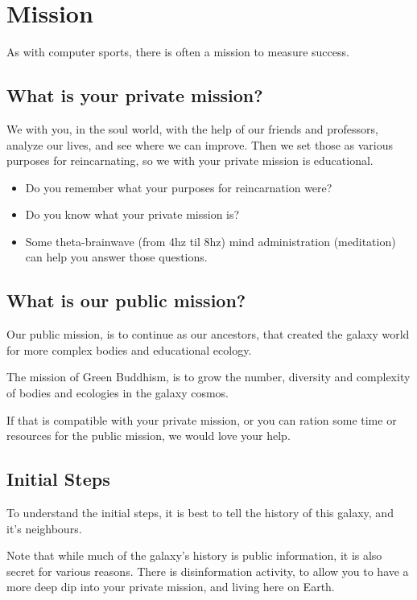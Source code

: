 \documentclass{report}
\begin{document}
\section{Mission}\label{mission}

As with computer sports, there is often a mission to measure success.

\subsection{What is your private mission?}

We with you, in the soul world, with the help of our friends and professors,
 analyze our lives, and see where we can improve. Then we set those as various
purposes for reincarnating, so we with your private mission is educational.

\begin{itemize}
\item Do you remember what your purposes for reincarnation were?
\item Do you know what your private mission is?
\item Some theta-brainwave (from 4hz til 8hz) mind administration (meditation) can help you answer those
questions. 
\end{itemize}

\subsection{What is our public mission?}

Our public mission, is to continue as our ancestors, that created the galaxy
world for more complex bodies and educational ecology.  


The mission of Green Buddhism, is to grow the number, diversity and complexity of bodies and
ecologies in the galaxy cosmos. 

If that is compatible with your private mission, or you can ration some time or
resources for
the public mission, we would love your help.

\subsection{Initial Steps}

To understand the initial steps, it is best to tell the history of this galaxy,
and it's neighbours.

Note that while much of the galaxy's history is public information, it is also
secret for various reasons. There is disinformation activity, to allow you to
have a more deep dip into your private mission, and living here on Earth.
\end{document}

